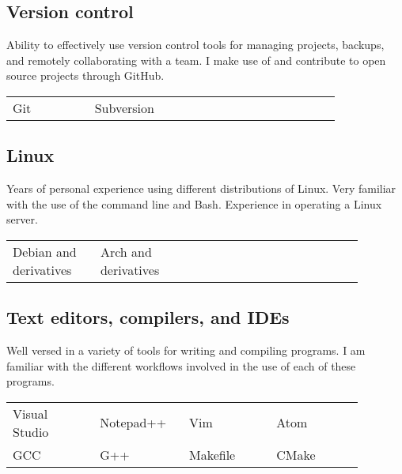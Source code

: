 \documentclass[letterpaper]{article}
\begin{document}
        \subsection*{Version control}
        Ability to effectively use version control tools for managing projects, backups, and remotely collaborating with a team.
        I make use of and contribute to open source projects through GitHub.

        \begin{center}
        \begin{tabular}{p{0.22\linewidth} p{0.22\linewidth} p{0.22\linewidth} p{0.22\linewidth}}
            Git & Subversion &&\\
        \end{tabular}
        \end{center}

        \subsection*{Linux}

        Years of personal experience using different distributions of Linux.
        Very familiar with the use of the command line and Bash.
        Experience in operating a Linux server.

        \begin{center}
        \begin{tabular}{p{0.22\linewidth} p{0.22\linewidth} p{0.22\linewidth} p{0.22\linewidth}}
            Debian and derivatives & Arch and derivatives &&\\
        \end{tabular}
        \end{center}

        \subsection*{Text editors, compilers, and IDEs}
        Well versed in a variety of tools for writing and compiling programs.
        I am familiar with the different workflows involved in the use of each of these programs.

        \begin{center}
        \begin{tabular}{p{0.22\linewidth} p{0.22\linewidth} p{0.22\linewidth} p{0.22\linewidth}}
            Visual Studio & Notepad++ & Vim & Atom \\
            GCC & G++ & Makefile & CMake \\
        \end{tabular}
        \end{center}
\end{document}
